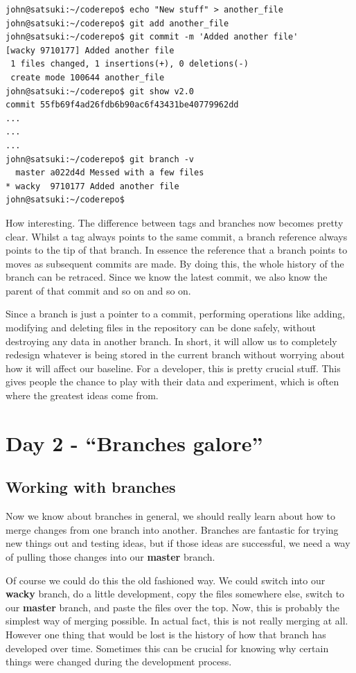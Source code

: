 \begin{Verbatim}
john@satsuki:~/coderepo$ echo "New stuff" > another_file
john@satsuki:~/coderepo$ git add another_file
john@satsuki:~/coderepo$ git commit -m 'Added another file'
[wacky 9710177] Added another file
 1 files changed, 1 insertions(+), 0 deletions(-)
 create mode 100644 another_file
john@satsuki:~/coderepo$ git show v2.0
commit 55fb69f4ad26fdb6b90ac6f43431be40779962dd
...
...
...
john@satsuki:~/coderepo$ git branch -v
  master a022d4d Messed with a few files
* wacky  9710177 Added another file
john@satsuki:~/coderepo$
\end{Verbatim}

How interesting.
The difference between tags and branches now becomes pretty clear.
Whilst a tag always points to the same commit, a branch reference always points to the tip of that branch.
In essence the reference that a branch points to moves as subsequent commits are made.
By doing this, the whole history of the branch can be retraced.
Since we know the latest commit, we also know the parent of that commit and so on and so on.

Since a branch is just a pointer to a commit, performing operations like adding, modifying and deleting files in the repository can be done safely, without destroying any data in another branch.
In short, it will allow us to completely redesign whatever is being stored in the current branch without worrying about how it will affect our baseline.
For a developer, this is pretty crucial stuff.
This gives people the chance to play with their data and experiment, which is often where the greatest ideas come from.

\section{Day 2 - ``Branches galore''}
\subsection{Working with branches}

Now we know about branches in general, we should really learn about how to merge changes from one branch into another.
Branches are fantastic for trying new things out and testing ideas, but if those ideas are successful, we need a way of pulling those changes into our \textbf{master} branch.

Of course we could do this the old fashioned way.
We could switch into our \textbf{wacky} branch, do a little development, copy the files somewhere else, switch to our \textbf{master} branch, and paste the files over the top.
Now, this is probably the simplest way of merging possible.
In actual fact, this is not really merging at all.
However one thing that would be lost is the history of how that branch has developed over time.
Sometimes this can be crucial for knowing why certain things were changed during the development process.

